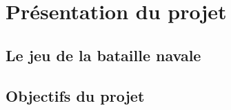 \chapter{Présentation du projet}

\section{Le jeu de la bataille navale}

\section{Objectifs du projet}

